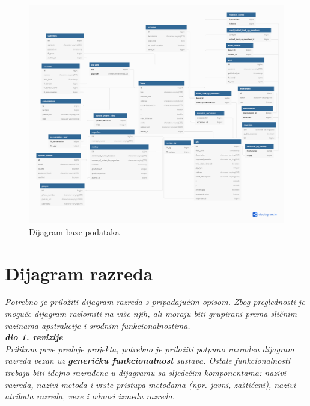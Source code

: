 			\begin{figure}[H]
			\begin{center}
				\includegraphics[width=17cm]{slike/ERModel.PNG}
			\end{center}
			\caption{Dijagram baze podataka}
			\label{fig:dijagramBaze}
		\end{figure}
			
			
			
		\section{Dijagram razreda}
		
			\textit{Potrebno je priložiti dijagram razreda s pripadajućim opisom. Zbog preglednosti je moguće dijagram razlomiti na više njih, ali moraju biti grupirani prema sličnim razinama apstrakcije i srodnim funkcionalnostima.}\\
			
			\textbf{\textit{dio 1. revizije}}\\
			
			\textit{Prilikom prve predaje projekta, potrebno je priložiti potpuno razrađen dijagram razreda vezan uz \textbf{generičku funkcionalnost} sustava. Ostale funkcionalnosti trebaju biti idejno razrađene u dijagramu sa sljedećim komponentama: nazivi razreda, nazivi metoda i vrste pristupa metodama (npr. javni, zaštićeni), nazivi atributa razreda, veze i odnosi između razreda.}\\
			
